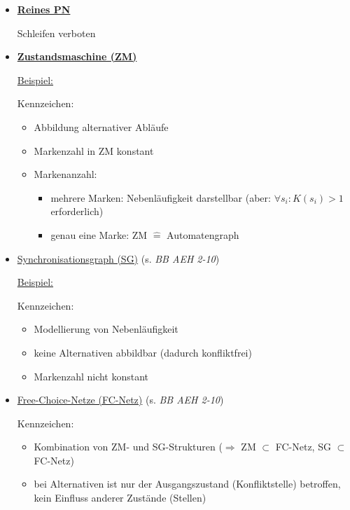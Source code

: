 \begin{itemize}
	\item \textbf{\underline{Reines PN}}
	
	Schleifen verboten
	
	\item \textbf{\underline{Zustandsmaschine (ZM)}}
	
	\underline{Beispiel:}
	
	Kennzeichen:
	\begin{itemize}
		\item Abbildung alternativer Abläufe
		\item Markenzahl in ZM konstant
		\item Markenanzahl:
		\begin{itemize}
			\item mehrere Marken: Nebenläufigkeit darstellbar (aber: $\forall s_i: K(s_i)>1$ erforderlich)
			\item genau eine Marke: ZM $\hat{=}$ Automatengraph
		\end{itemize}
	\end{itemize}

	\item \underline{Synchronisationsgraph (SG)} (s. \textit{BB AEH 2-10})
	
	\underline{Beispiel:}
	
	Kennzeichen:
	\begin{itemize}
		\item Modellierung von Nebenläufigkeit
		\item keine Alternativen abbildbar (dadurch konfliktfrei)
		\item Markenzahl nicht konstant
	\end{itemize}

	\item \underline{Free-Choice-Netze (FC-Netz)} (s. \textit{BB AEH 2-10})
	
	Kennzeichen:
	\begin{itemize}
		\item Kombination von ZM- und SG-Strukturen \newline ($\Rightarrow$ ZM $\subset$ FC-Netz, SG $\subset$ FC-Netz)
		\item bei Alternativen ist nur der Ausgangszustand (Konfliktstelle) betroffen, kein Einfluss anderer Zustände (Stellen)
	\end{itemize}
\end{itemize}

